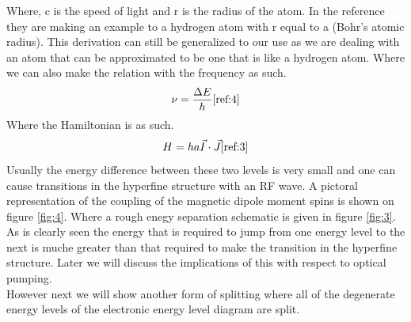 \documentclass[twocolumn]{article}
\begin{document}
Where, c is the speed of light and r is the radius of the atom. In the 
reference they are making an example to a hydrogen atom with r equal to a 
(Bohr's atomic radius). This derivation can still be generalized to our use as 
we are dealing with an atom that can be approximated to be one that is like a 
hydrogen atom. Where we can also make the relation with the frequency as such.
\begin{equation}
\nu = \frac{\Delta E}{h}
\label{eqn:4}
\cite{ref:4}
\end{equation}
Where the Hamiltonian is as such.
\begin{equation}
H=ha\vec{I}\cdot\vec{J}
\label{eqn:5}
\cite{ref:3}
\end{equation}
Usually the energy difference between these two levels is very small and one 
can cause transitions in the hyperfine structure with an RF wave. A pictoral 
representation of the coupling of the magnetic dipole moment spins is shown on 
figure \ref{fig:4}. Where a rough enegy separation schematic is given in figure 
\ref{fig:3}. As is clearly seen the energy that is required to jump from one 
energy level to the next is muche greater than that required to make the 
transition in the hyperfine structure. Later we will discuss the implications 
of this with respect to optical pumping.
\\
However next we will show another form of splitting where all of the degenerate 
energy levels of the electronic energy level diagram are split.
\end{document}
